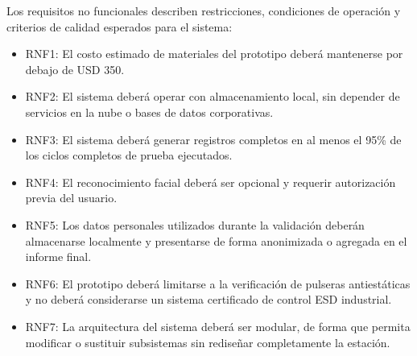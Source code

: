 Los requisitos no funcionales describen restricciones, condiciones de operación y criterios
de calidad esperados para el sistema:

\begin{itemize}
    \item RNF1: El costo estimado de materiales del prototipo deberá mantenerse por debajo de USD 350.

    \item RNF2: El sistema deberá operar con almacenamiento local, sin depender de servicios en la nube o bases de datos corporativas.

    \item RNF3: El sistema deberá generar registros completos en al menos el 95\% de los ciclos completos de prueba ejecutados.

    \item RNF4: El reconocimiento facial deberá ser opcional y requerir autorización previa del usuario.

    \item RNF5: Los datos personales utilizados durante la validación deberán almacenarse localmente y presentarse de forma anonimizada o agregada en el informe final.

    \item RNF6: El prototipo deberá limitarse a la verificación de pulseras antiestáticas y no deberá considerarse un sistema certificado de control ESD industrial.

    \item RNF7: La arquitectura del sistema deberá ser modular, de forma que permita modificar o sustituir subsistemas sin rediseñar completamente la estación.

\end{itemize}
